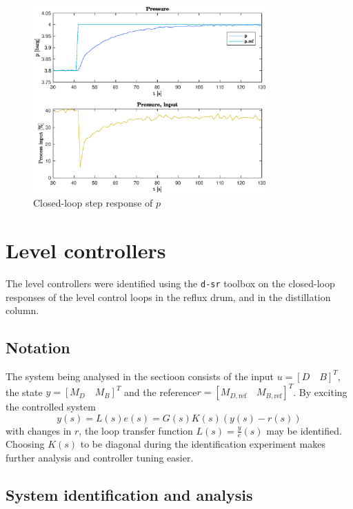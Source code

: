 \documentclass[12pt]{article}
\begin{document}
\begin{figure}[p]
\centering
\includegraphics[width=0.8\textwidth]{../Systemanalyse/Log_Data_to_Matlab/Figurer/Stegeksperimenter/PC1024_step.eps}
\caption{Closed-loop step response of $p$}
\label{fig:cl_step_PC1024}
\end{figure}


\newpage
\section{Level controllers}
The level controllers were identified using the \texttt{d-sr} toolbox on the closed-loop responses of the level control loops in the reflux drum, and in the distillation column.

\subsection{Notation}
The system being analysed in the sectioon consists of the input $u = [D \quad B]^T$, the state $y = [M_D \quad M_B]^T$ and the reference$r = [M_{D, \textrm{ref}} \quad M_{B, \textrm{ref}}]^T$. By exciting the controlled system
\begin{equation}
y(s) = L(s)e(s) = G(s) K(s) (y(s) - r(s))
\end{equation}
with changes in $r$, the loop transfer function $L(s) = \frac{y}{e}(s)$ may be identified. Choosing $K(s)$ to be diagonal during the identification experiment makes further analysis and controller tuning easier.

\subsection{System identification and analysis}
\end{document}
